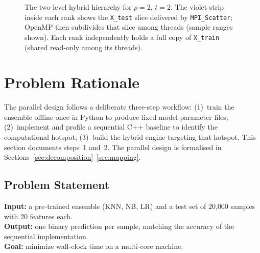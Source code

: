 \documentclass[12pt,a4paper]{article}
\begin{document}
\begin{figure}[H]
\caption{The two-level hybrid hierarchy for $p=2$, $t=2$.
  The violet strip inside each rank shows the \texttt{X\_test} slice delivered
  by \texttt{MPI\_Scatter}; OpenMP then subdivides that slice among threads
  (sample ranges shown). Each rank independently holds a full copy of
  \texttt{X\_train} (shared read-only among its threads).}
\label{fig:hybrid_hierarchy}
\end{figure}

\section{Problem Rationale}

The parallel design follows a deliberate three-step workflow: (1)~train the
ensemble offline once in Python to produce fixed model-parameter files;
(2)~implement and profile a sequential C++ baseline to identify the
computational hotspot; (3)~build the hybrid engine targeting that hotspot.
This section documents steps~1 and~2. The parallel design is formalised
in Sections~\ref{sec:decomposition}--\ref{sec:mapping}.

\subsection{Problem Statement}

\textbf{Input:} a pre-trained ensemble (KNN, NB, LR) and a test set of
20{,}000 samples with 20 features each.\\
\textbf{Output:} one binary prediction per sample, matching the accuracy of
the sequential implementation.\\
\textbf{Goal:} minimize wall-clock time on a multi-core machine.
\end{document}
